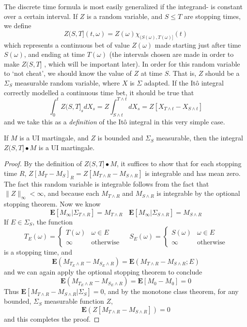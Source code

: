 The discrete time formula is most easily generalized if the integrand- is constant over a certain interval. If $Z$ is a random variable, and $S \leq T$ are stopping times, we define
%
\[ Z(S,T](t,\omega) = Z(\omega) \chi_{(S(\omega), T(\omega)]}(t) \]
%
which represents a continuous bet of value $Z(\omega)$ made starting just after time $S(\omega)$, and ending at time $T(\omega)$ (the intervals chosen are made in order to make $Z(S,T]$ \caglad, which will be important later). In order for this random variable to `not cheat', we should know the value of $Z$ at time $S$. That is, $Z$ should be a $\Sigma_S$ measurable random variable, where $X$ is $\Sigma$ adapted. If the It\^{o} integral correctly modelled a continuous time bet, it should be true that
%
\[ \int_0^t Z(S,T]_s dX_s = Z \int_{S \wedge t}^{T \wedge t} dX_s = Z [X_{T \wedge t} - X_{S \wedge t}] \]
%
and we take this as a {\it definition} of the It\^{o} integral in this very simple case.

\begin{lemma}
    If $M$ is a UI martingale, and $Z$ is bounded and $\Sigma_S$ measurable, then the integral $Z(S,T] \bullet M$ is a UI martingale.
\end{lemma}
\begin{proof}
    By the definition of $Z(S,T] \bullet M$, it suffices to show that for each stopping time $R$, $Z[M_T - M_S]_R = Z[M_{T \wedge R} - M_{S \wedge R}]$ is integrable and has mean zero. The fact this random variable is integrable follows from the fact that $\| Z \|_\infty < \infty$, and because each $M_{T \wedge R}$ and $M_{S \wedge R}$ is integrable by the optional stopping theorem. Now we know
    \[ \mathbf{E}[M_\infty | \Sigma_{T \wedge R}] = M_{T \wedge R}\ \ \ \ \mathbf{E}[M_\infty | \Sigma_{S \wedge R}] = M_{S \wedge R} \]
    If $E \in \Sigma_S$, the function
    \[ T_E(\omega) = \begin{cases} T(\omega) & \omega \in E \\ \infty & \text{otherwise} \end{cases}\ \ \ \ \ S_E(\omega) = \begin{cases} S(\omega) & \omega \in E \\ \infty & \text{otherwise} \end{cases} \]
    is a stopping time, and
    \[ \mathbf{E}(M_{T_E \wedge R} - M_{S_E \wedge R}) = \mathbf{E}(M_{T \wedge R} - M_{S \wedge R}; E) \]
    and we can again apply the optional stopping theorem to conclude
    \[ \mathbf{E}(M_{T_E \wedge R} - M_{S_E \wedge R}) = \mathbf{E}[M_0 - M_0] = 0 \]
    Thus $\mathbf{E}[M_{T \wedge R} - M_{S \wedge R} | \Sigma_S] = 0$, and by the monotone class theorem, for any bounded, $\Sigma_S$ measurable function $Z$,
    \[ \mathbf{E}(Z[M_{T \wedge R} - M_{S \wedge R}]) = 0 \]
    and this completes the proof.
\end{proof}

